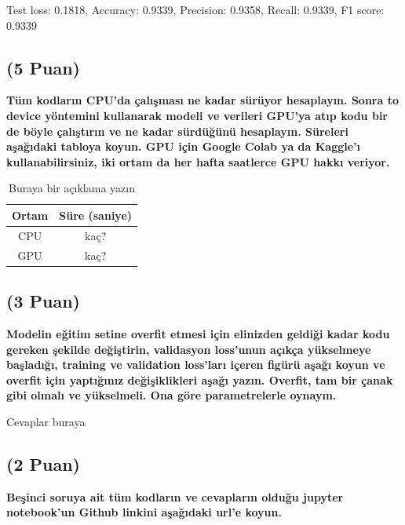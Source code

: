 \documentclass[11pt]{article}
\begin{document}
Test loss: 0.1818, Accuracy: 0.9339, Precision: 0.9358, Recall: 0.9339, F1 score: 0.9339

\subsection{(5 Puan)} \textbf{Tüm kodların CPU'da çalışması ne kadar sürüyor hesaplayın. Sonra to device yöntemini kullanarak modeli ve verileri GPU'ya atıp kodu bir de böyle çalıştırın ve ne kadar sürdüğünü hesaplayın. Süreleri aşağıdaki tabloya koyun. GPU için Google Colab ya da Kaggle'ı kullanabilirsiniz, iki ortam da her hafta saatlerce GPU hakkı veriyor.}

\begin{table}[ht!]
    \centering
    \caption{Buraya bir açıklama yazın}
    \begin{tabular}{c|c}
        Ortam & Süre (saniye) \\\hline
        CPU & kaç? \\
        GPU & kaç?\\
    \end{tabular}
    \label{tab:my_table}
\end{table}

\subsection{(3 Puan)} \textbf{Modelin eğitim setine overfit etmesi için elinizden geldiği kadar kodu gereken şekilde değiştirin, validasyon loss'unun açıkça yükselmeye başladığı, training ve validation loss'ları içeren figürü aşağı koyun ve overfit için yaptığınız değişiklikleri aşağı yazın. Overfit, tam bir çanak gibi olmalı ve yükselmeli. Ona göre parametrelerle oynayın.}

Cevaplar buraya

\subsection{(2 Puan)} \textbf{Beşinci soruya ait tüm kodların ve cevapların olduğu jupyter notebook'un Github linkini aşağıdaki url'e koyun.}
\end{document}
